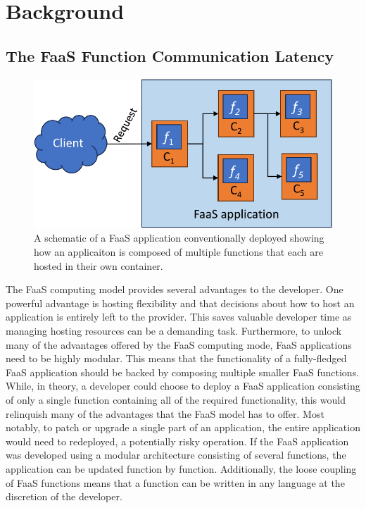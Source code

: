 \section{Background}

\subsection{The FaaS Function Communication Latency}
\label{es:subsec:faas-apps}

\begin{figure}
  \centering
  \includegraphics[width=\columnwidth]{figures/faas_application}
  \caption{\label{es:fig:faas-app} A schematic of a FaaS application conventionally deployed showing how an applicaiton is composed of multiple functions that each are hosted in their own container.}
\end{figure}

The FaaS computing model provides several advantages to the developer. One powerful advantage is hosting flexibility and that decisions about how to host an application is entirely left to the provider. This saves valuable developer time as managing hosting resources can be a demanding task. Furthermore, to unlock many of the advantages offered by the FaaS computing mode, FaaS applications need to be highly modular. This means that the functionality of a fully-fledged FaaS application should be backed by composing multiple smaller FaaS functions. While, in theory, a developer could choose to deploy a FaaS application consisting of only a single function containing all of the required functionality, this would relinquish many of the advantages that the FaaS model has to offer. Most notably, to patch or upgrade a single part of an application, the entire application would need to redeployed, a potentially risky operation. If the FaaS application was developed using a modular architecture consisting of several functions, the application can be updated function by function. Additionally, the loose coupling of FaaS functions means that a function can be written in any language at the discretion of the developer.

